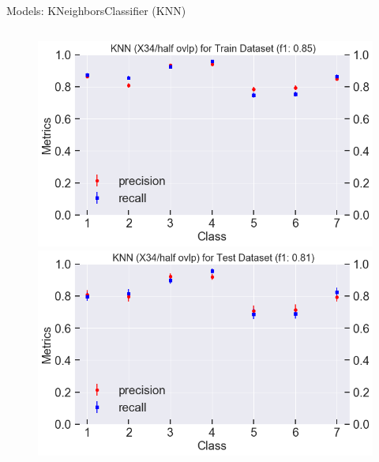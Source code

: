 \documentclass{if-beamer}
\begin{document}
\begin{frame}{Models:  KNeighborsClassifier (KNN)}
\begin{columns}
\begin{column}{0.5\textwidth}
             \begin{figure}
            \includegraphics[scale=0.23]{./figs/knn_X34_half_train_score.png}
            \includegraphics[scale=0.23]{./figs/knn_X34_half_test_score.png}
            \end{figure}  
        
 \end{column}

 \end{columns}
   \end{frame}
\end{document}
